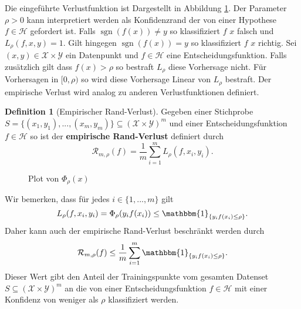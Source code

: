 \documentclass{article}
\DeclareMathOperator{\sign}{sgn}
\theoremstyle{plain}
\theoremstyle{definition}
\newtheorem{dfn}[thm]{Definition}
\begin{document}
    Die eingeführte Verlustfunktion ist Dargestellt in Abbildung \ref{fig:margin_loss}. Der Parameter $\rho > 0$ kann interpretiert werden als Konfidenzrand der von einer Hypothese $f \in \mathcal{H}$ gefordert ist. Falls $\sign(f(x)) \neq y$ so klassifiziert $f$ $x$ falsch und $L_{\rho}(f,x,y) = 1$. Gilt hingegen $\sign(f(x)) = y$ so klassifiziert $f$ $x$ richtig. Sei $(x,y) \in \mathcal{X} \times \mathcal{Y}$ ein Datenpunkt und $f \in \mathcal{H}$ eine Entscheidungsfunktion. Falls zusätzlich gilt dass $f(x) > \rho$ so bestraft $L_{\rho}$ diese Vorhersage nicht. Für Vorhersagen in $[0, \rho)$ so wird diese Vorhersage Linear von $L_{\rho}$ bestraft. Der empirische Verlust wird analog zu anderen Verlustfunktionen definiert.


    \begin{dfn}[Empirischer Rand-Verlust]
        Gegeben einer Stichprobe $S = \{(x_{1},y_{1}),..., (x_{m},y_{m})\} \subseteq (\mathcal{X} \times \mathcal{Y})^{m}$ und einer Entscheidungsfunktion $f \in \mathcal{H}$ so ist der \textbf{empirische Rand-Verlust} definiert durch
        \[
            \mathcal{R}_{m,\rho}(f) = \frac{1}{m} \sum_{i = 1}^{m} L_{\rho}(f, x_{i}, y_{i}).
        \]
    \end{dfn}
    
    \begin{figure}[h]
    \centering
    \caption{Plot von $\Phi_{\rho}(x)$}
    \label{fig:margin_loss}
    \end{figure}
    
    \vspace{10mm}
    
    Wir bemerken, dass für jedes $i \in \{1,...,m\}$ gilt
    \[
        L_{\rho}(f,x_{i},y_{i})
        =
        \Phi_{\rho}(y_{i} f(x_{i}))
        \leq
        \mathbbm{1}_{\{y_{i} f(x_{i}) \leq \rho \}}.
    \]
    Daher kann auch der empirische Rand-Verlust beschränkt werden durch
    \[
        \mathcal{R}_{m, \rho}(f)
        \leq
        \frac{1}{m} \sum_{i = 1}^{m} \mathbbm{1}_{\{y_{i} f(x_{i}) \leq \rho \}}.
    \]
    Dieser Wert gibt den Anteil der Trainingspunkte vom gesamten Datenset $S \subseteq (\mathcal{X} \times \mathcal{Y})^{m}$ an die von einer Entscheidungsfunktion $f \in \mathcal{H}$ mit einer Konfidenz von weniger als $\rho$ klassifiziert werden.
    
\end{document}
